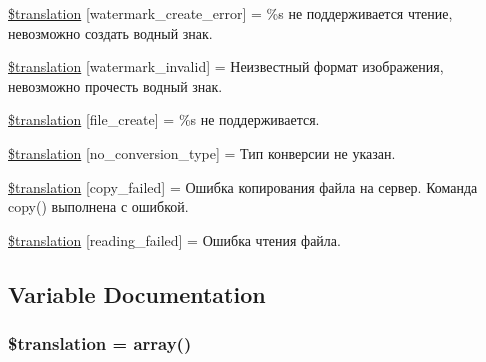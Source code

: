 \begin{DoxyCompactItemize}
\item 
\hyperlink{class_8upload_8ru___r_u_8php_aabca0b65dadbc6184415c16375f284ca}{\$translation} \mbox{[}\textquotesingle{}watermark\+\_\+create\+\_\+error\textquotesingle{}\mbox{]} = \textquotesingle{}\%s не поддерживается чтение, невозможно создать водный знак.\textquotesingle{}
\item 
\hyperlink{class_8upload_8ru___r_u_8php_ac336e7a5701e47ba4a05e9e498a3cc44}{\$translation} \mbox{[}\textquotesingle{}watermark\+\_\+invalid\textquotesingle{}\mbox{]} = \textquotesingle{}Неизвестный формат изображения, невозможно прочесть водный знак.\textquotesingle{}
\item 
\hyperlink{class_8upload_8ru___r_u_8php_a1ecb4673e4fb69e06b3f20b65cecf30a}{\$translation} \mbox{[}\textquotesingle{}file\+\_\+create\textquotesingle{}\mbox{]} = \textquotesingle{}\%s не поддерживается.\textquotesingle{}
\item 
\hyperlink{class_8upload_8ru___r_u_8php_a4712d7ec28e9a7f17eb3338af2358363}{\$translation} \mbox{[}\textquotesingle{}no\+\_\+conversion\+\_\+type\textquotesingle{}\mbox{]} = \textquotesingle{}Тип конверсии не указан.\textquotesingle{}
\item 
\hyperlink{class_8upload_8ru___r_u_8php_a783c9358bcf54a054545b50098bc679b}{\$translation} \mbox{[}\textquotesingle{}copy\+\_\+failed\textquotesingle{}\mbox{]} = \textquotesingle{}Ошибка копирования файла на сервер. Команда copy() выполнена с ошибкой.\textquotesingle{}
\item 
\hyperlink{class_8upload_8ru___r_u_8php_a01bea14c9fd5f353f62db44beabfcd42}{\$translation} \mbox{[}\textquotesingle{}reading\+\_\+failed\textquotesingle{}\mbox{]} = \textquotesingle{}Ошибка чтения файла.\textquotesingle{}
\end{DoxyCompactItemize}


\subsection{Variable Documentation}
\hypertarget{class_8upload_8ru___r_u_8php_a1f198d410fecc3871ebdd468d343a5e3}{}
\subsubsection[{\$translation}]{\setlength{\rightskip}{0pt plus 5cm}\$translation = array()}\label{class_8upload_8ru___r_u_8php_a1f198d410fecc3871ebdd468d343a5e3}
\hypertarget{class_8upload_8ru___r_u_8php_ac7498e49b9771b04698029aa61c70821}{}
